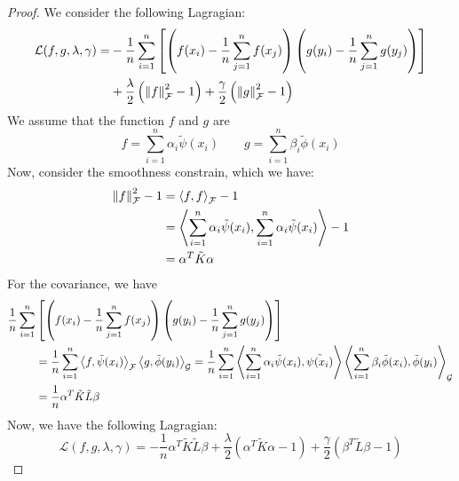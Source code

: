 \begin{proof}
    We consider the following Lagragian:
    \begin{equation*}
    \begin{aligned}
        \mathcal{L}(f,g,\lambda,\gamma) = &-\frac{1}{n}\sum^n_{i=1}\left[  \left( f(x_i) - \frac{1}{n}\sum^n_{j=1}f(x_j) \right) \left( g(y_i) - \frac{1}{n}\sum^n_{j=1}g(y_j) \right)  \right] \\
        &+ \frac{\lambda}{2} \left( \left\lVert f\right\rVert^2_\mathcal{F}-1 \right) + \frac{\gamma}{2}\left( \left\lVert g\right\rVert^2_\mathcal{F}-1 \right)
    \end{aligned}
    \end{equation*}
    We assume that the function $f$ and $g$ are 
    \begin{equation*}
        f=\sum^n_{i=1}\alpha_i\tilde{\psi}(x_i) \qquad g=\sum^n_{i=1}\beta_i\tilde{\phi}(x_i)
    \end{equation*}
    Now, consider the smoothness constrain, which we have:
    \begin{equation*}
    \begin{aligned}
        \left\lVert f\right\rVert^2_\mathcal{F}-1 &= \left\langle f, f \right\rangle_\mathcal{F} - 1 \\
        &= \left\langle \sum^n_{i=1}\alpha_i\tilde{\psi}(x_i), \sum^n_{i=1}\alpha_i\tilde{\psi}(x_i) \right\rangle - 1 \\
        &=\alpha^T\tilde{K}\alpha  
    \end{aligned}
    \end{equation*}
    For the covariance, we have
    \begin{equation*}
    \begin{aligned}
        \frac{1}{n}\sum^n_{i=1}&\left[  \left( f(x_i) - \frac{1}{n}\sum^n_{j=1}f(x_j) \right) \left( g(y_i) - \frac{1}{n}\sum^n_{j=1}g(y_j) \right)  \right] \\
        &= \frac{1}{n}\sum^n_{i=1}\left\langle f, \tilde{\psi}(x_i) \right\rangle_\mathcal{F}\left\langle g, \tilde{\phi}(y_i) \right\rangle_\mathcal{G} = \frac{1}{n}\sum^n_{i=1}\left\langle \sum^n_{i=1}\alpha_i\tilde{\psi}(x_i), \tilde{\psi(x_i)} \right\rangle\left\langle \sum^n_{i=1}\beta_i\tilde{\phi}(x_i), \tilde{\phi}(y_i) \right\rangle_\mathcal{G} \\
        &= \frac{1}{n}\alpha^T\tilde{K}\tilde{L}\beta
    \end{aligned}
    \end{equation*}
    Now, we have the following Lagragian:
    \begin{equation*}
        \mathcal{L}(f,g,\lambda,\gamma) = -\frac{1}{n}\alpha^T\tilde{K}\tilde{L}\beta + \frac{\lambda}{2}(\alpha^T\tilde{K}\alpha-1) +\frac{\gamma}{2}(\beta^T\tilde{L}\beta-1)

\end{equation*}
\end{proof}
